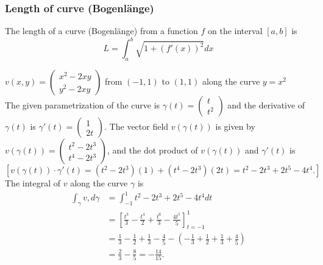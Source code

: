 \documentclass[8pt]{extarticle}
\def\BoxStart{\begin{tcolorbox}[colback=blue!5!white,colframe=blue!75!black]}
\def\BoxEnd{\end{tcolorbox}}
\begin{document}
\begin{multicols*}{3}
\subsubsection{Length of curve (Bogenlänge)}
The length of a curve (Bogenlänge) from a function $f$ on the interval $[a, b]$ is 
$$ L = \int_a^b \sqrt{1 + (f'(x))^2}dx$$
\BoxStart
$v(x, y) = \begin{pmatrix}
    x^2 - 2xy\\
    y^2 - 2xy
  \end{pmatrix}$
from $(-1, 1)$ to $(1, 1)$ along the curve $y = x^2$ \\
The given parametrization of the curve is 
$\gamma(t) = \begin{pmatrix} 
	t \\ 
	t^2 
	\end{pmatrix}$
and the derivative of $\gamma(t)$ is 
$\gamma'(t) = \begin{pmatrix}
	 1 \\
	 2t \end{pmatrix}$. 
The vector field $v(\gamma(t))$ is given by 
$v(\gamma(t)) = 
	\begin{pmatrix} 
	t^2 - 2t^3 \\
	 t^4 - 2t^3 
	\end{pmatrix}$,
 and the dot product of $v(\gamma(t))$ and $\gamma'(t)$ is
$$[v(\gamma(t)) \cdot \gamma'(t) = (t^2 - 2t^3)(1) + (t^4 - 2t^3)(2t) = t^2 - 2t^3 + 2t^5 - 4t^4.]$$
The integral of $v$ along the curve $\gamma$ is
\begin{align*}
	\int_\gamma v , d\gamma &= \int_{-1}^1 t^2 - 2t^3 + 2t^5 - 4t^4  dt \\
	&= \left[\frac{t^3}{3} - \frac{t^4}{2} + \frac{t^6}{3} - \frac{4t^5}{5}\right]_{t=-1}^1 \\
	&= \frac{1}{3} - \frac{1}{2} + \frac{1}{3} - \frac{4}{5} - \left(-\frac{1}{3} + \frac{1}{2} + \frac{1}{3} + \frac{4}{5}\right) \\
	&= \frac{2}{3} - \frac{8}{5} = -\frac{14}{15}.
\end{align*}
\BoxEnd


\end{multicols*}
\end{document}
